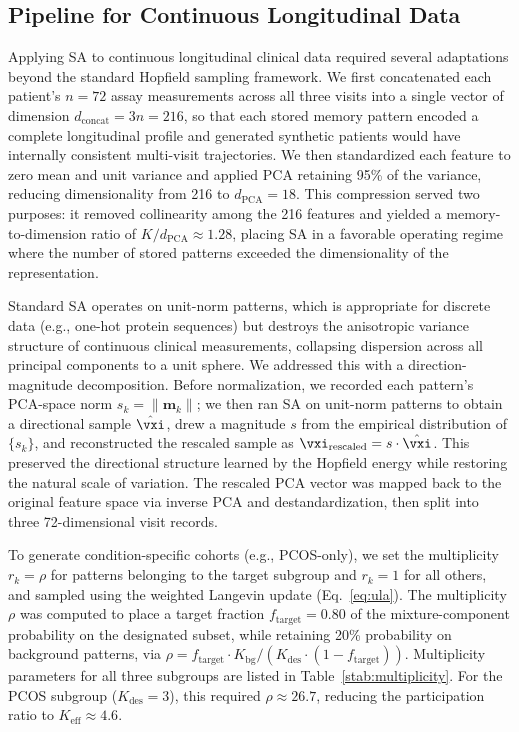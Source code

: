 \subsection{Pipeline for Continuous Longitudinal Data}
\label{sec:pipeline}

Applying SA to continuous longitudinal clinical data required several adaptations
beyond the standard Hopfield sampling framework. We first concatenated each patient's
$n{=}72$ assay measurements across all three visits into a single vector of dimension
$d_{\text{concat}} = 3n = 216$, so that each stored memory pattern encoded a
complete longitudinal profile and generated synthetic patients would have internally
consistent multi-visit trajectories. We then standardized each feature to zero mean
and unit variance and applied PCA retaining 95\% of the variance, reducing
dimensionality from 216 to $d_{\text{PCA}}{=}18$. This compression served two
purposes: it removed collinearity among the 216 features and yielded a
memory-to-dimension ratio of $K/d_{\text{PCA}} \approx 1.28$, placing SA in a
favorable operating regime where the number of stored patterns exceeded the
dimensionality of the representation.

Standard SA operates on unit-norm patterns, which is appropriate for discrete data
(e.g., one-hot protein sequences) but destroys the anisotropic variance structure
of continuous clinical measurements, collapsing dispersion across all principal
components to a unit sphere. We addressed this with a direction-magnitude
decomposition. Before normalization, we recorded each pattern's PCA-space norm
$s_k = \|\mathbf{m}_k\|$; we then ran SA on unit-norm patterns to obtain a
directional sample $\hat{\vxi}$, drew a magnitude $s$ from the empirical
distribution of $\{s_k\}$, and reconstructed the rescaled sample as
$\vxi_{\text{rescaled}} = s \cdot \hat{\vxi}$. This preserved the directional
structure learned by the Hopfield energy while restoring the natural scale of
variation. The rescaled PCA vector was mapped back to the original feature space via
inverse PCA and destandardization, then split into three 72-dimensional visit records.

To generate condition-specific cohorts (e.g., PCOS-only), we set the multiplicity
$r_k = \rho$ for patterns belonging to the target subgroup and $r_k = 1$ for all
others, and sampled using the weighted Langevin update (Eq.~\ref{eq:ula}). The
multiplicity $\rho$ was computed to place a target fraction
$f_{\text{target}} = 0.80$ of the mixture-component probability on the designated subset,
while retaining 20\% probability on background patterns, via
$\rho = f_{\text{target}} \cdot K_{\text{bg}} / (K_{\text{des}} \cdot (1 -
f_{\text{target}}))$. Multiplicity parameters for all three subgroups are
listed in Table~\ref{stab:multiplicity}. For the PCOS subgroup
($K_{\text{des}}{=}3$), this required $\rho \approx 26.7$, reducing the
participation ratio to $K_{\text{eff}} \approx 4.6$. 



